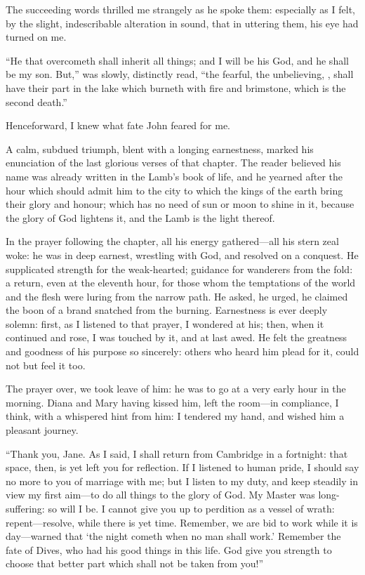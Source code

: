 The succeeding words thrilled me strangely as he spoke them: especially
as I felt, by the slight, indescribable alteration in sound, that in
uttering them, his eye had turned on me.

\enquote{He that overcometh shall inherit all things; and I will be his
	God, and he shall be my son. But,} was slowly, distinctly read,
\enquote{the fearful, the unbelieving, \etc, shall have their part in
	the lake which burneth with fire and brimstone, which is the second
	death.}

Henceforward, I knew what fate \St{} John feared for me.

A calm, subdued triumph, blent with a longing earnestness, marked his
enunciation of the last glorious verses of that chapter. The reader
believed his name was already written in the Lamb's book of life, and he
yearned after the hour which should admit him to the city to which the
kings of the earth bring their glory and honour; which has no need of
sun or moon to shine in it, because the glory of God lightens it, and
the Lamb is the light thereof.

In the prayer following the chapter, all his energy gathered---all his
stern zeal woke: he was in deep earnest, wrestling with God, and
resolved on a conquest. He supplicated strength for the weak-hearted;
guidance for wanderers from the fold: a return, even at the eleventh
hour, for those whom the temptations of the world and the flesh were
luring from the narrow path. He asked, he urged, he claimed the boon of
a brand snatched from the burning. Earnestness is ever deeply solemn:
first, as I listened to that prayer, I wondered at his; then, when it
continued and rose, I was touched by it, and at last awed. He felt the
greatness and goodness of his purpose so sincerely: others who heard him
plead for it, could not but feel it too.

The prayer over, we took leave of him: he was to go at a very early hour
in the morning. Diana and Mary having kissed him, left the room---in
compliance, I think, with a whispered hint from him: I tendered my hand,
and wished him a pleasant journey.

\enquote{Thank you, Jane. As I said, I shall return from Cambridge in a
	fortnight: that space, then, is yet left you for reflection. If I
	listened to human pride, I should say no more to you of marriage with
	me; but I listen to my duty, and keep steadily in view my first aim---to
	do all things to the glory of God. My Master was long-suffering: so
	will I be. I cannot give you up to perdition as a vessel of wrath:
	repent---resolve, while there is yet time. Remember, we are bid to work
	while it is day---warned that \enquote{the night cometh when no man
		shall work.} Remember the fate of Dives, who had his good things in
	this life. God give you strength to choose that better part which shall
	not be taken from you!}

